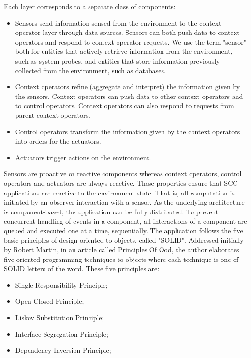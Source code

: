\documentclass{acm_proc_article-sp}
\begin{document}
Each layer corresponds to a separate class of components: 
\begin{itemize}
\item Sensors send information sensed from the environment to the context operator layer through data sources. Sensors can both push data to context operators and respond to context operator requests. We use the term "sensor" both for entities that actively retrieve information from the environment, such as system probes, and entities that store information previously collected from the environment, such as databases.
\item Context operators refine (aggregate and interpret) the information given by the sensors. Context operators can push data to other context operators and to control operators. Context operators can also respond to requests from parent context operators. 
\item Control operators transform the information given by the context operators into orders for the actuators. 
\item Actuators trigger actions on the environment.
\end{itemize}

Sensors are proactive or reactive components whereas context operators, control operators and actuators are always reactive. These properties ensure that SCC applications are reactive to the environment state. That is, all computation is initiated by an observer interaction with a sensor.
\newline
\newline
As the underlying architecture is component-based, the application can be fully distributed. To prevent concurrent handling of events in a component, all interactions of a component are queued and executed one at a time, sequentially.
\newline
\newline
The application follows the five basic principles of design oriented to objects, called "SOLID". Addressed initially by Robert Martin, in an article called Principles Of Ood, the author elaborates five-oriented programming techniques to objects where each technique is one of SOLID letters of the word. These five principles are:
\begin{itemize}
\item Single Responsibility Principle;
\item Open Closed Principle;
\item Liskov Substitution Principle;
\item Interface Segregation Principle;
\item Dependency Inversion Principle;
\end{itemize} 
\end{document}
